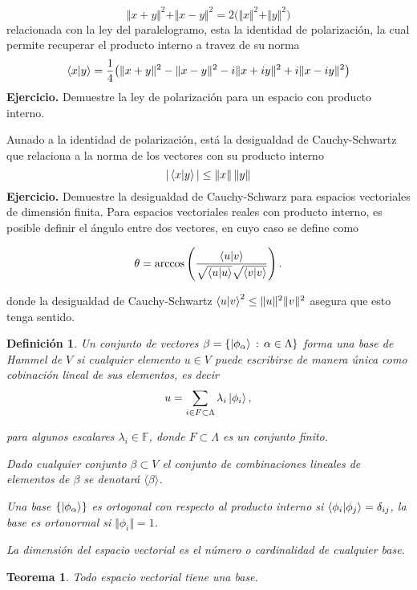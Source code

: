 \documentclass[letterpaper]{book}
\newtheorem{teorema}{Teorema}[section]
\newtheorem{def.}{Definici\'on}[section]
\newcommand{\exe}{{\noindent \sc \textbf{Ejercicio. }}}
\begin{document}
\[
\Vert x+y\Vert^2+\Vert x-y\Vert^2=2\big(\Vert x\Vert^2+\Vert y\Vert^2\big)
\]
\noindent relacionada con la ley del paralelogramo, esta la identidad de polarización, la cual permite recuperar el producto interno a travez de su norma
\[
\braket{x|y}=\frac{1}{4}\big(\Vert x+y\Vert^2-\Vert x-y\Vert^2-i\Vert x+iy\Vert^2+i\Vert x-iy\Vert^2\big)
\]
\exe Demuestre la ley de polarización para un espacio con producto interno.

Aunado a la identidad de polarización, está la desigualdad de Cauchy-Schwartz que relaciona a la norma de los vectores con su producto interno
\begin{equation}
  |\braket{x|y}|\leq\| x\|\,\| y\|
\end{equation}
\exe Demuestre la desigualdad de Cauchy-Schwarz para espacios vectoriales de dimensión finita.
Para espacios vectoriales reales con producto interno, es posible definir el ángulo entre dos vectores, en cuyo caso se define como

\[
\theta = \arccos\left(\frac{\braket{u | v}}{\sqrt{\braket{u | u}} \sqrt{\braket{v | v}}}\right).
\]

\noindent donde la desigualdad de Cauchy-Schwartz \(\braket{u | v}^2 \leq \Vert u\Vert^2\Vert v \Vert^2\) asegura que esto tenga sentido.

\begin{def.}
Un conjunto de vectores \(\beta=\{\ket{\phi_{\alpha}}\,:\,\alpha\in \Lambda \}\) forma una base de Hammel de \(V\) si cualquier elemento \(u \in V\) puede escribirse de manera única como cobinación lineal de sus elementos, es decir
\[
u = \sum_{i\in F\subset\Lambda} \lambda_i \ket{\phi_i},
\]

\noindent para algunos escalares \(\lambda_i\in\mathbb{F}\), donde \(F\subset\Lambda\) es un conjunto finito.

\noindent Dado cualquier conjunto \(\beta\subset V\) el conjunto de combinaciones lineales de elementos de \(\beta\) se denotará \(\langle\beta\rangle\).

\noindent Una base \(\{\ket{\phi_{\alpha}}\}\) es ortogonal con respecto al producto interno si \(\braket{\phi_i | \phi_j}=\delta_{ij}\), la base es ortonormal si \(\Vert \phi_i\Vert = 1\).

\noindent La dimensión del espacio vectorial es el número o cardinalidad de cualquier base.
\end{def.}

\begin{teorema}
  Todo espacio vectorial tiene una base.
\end{teorema}
\end{document}
